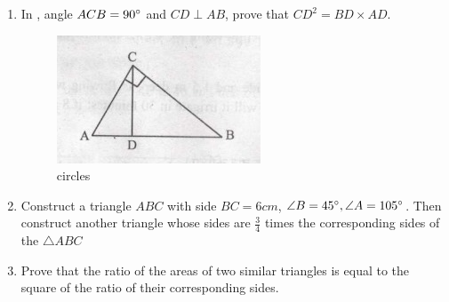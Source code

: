 \begin{enumerate}
\begin{figure}[H]
				
			\end{figure} 
\item In , angle $ACB = 90\degree$ and $CD \perp AB$, prove that $CD ^ 2 = BD \times AD$.
	\begin{figure}[H]                                                            \centering
		                \includegraphics[width=\columnwidth]{figs/i3.jpeg}
				\caption{circles}
				\label{fig:construcion45}
		        \end{figure}
		        
\item Construct a triangle $ABC$ with side $BC = 6 cm$, $\angle B=45\degree, \angle A= 105\degree$. Then construct another triangle whose sides are $\frac{3}{4}$ times the corresponding sides of the $\triangle ABC$
\item Prove that the ratio of the areas of two similar triangles is equal to the square of the ratio of their corresponding sides. 
\end{enumerate}
